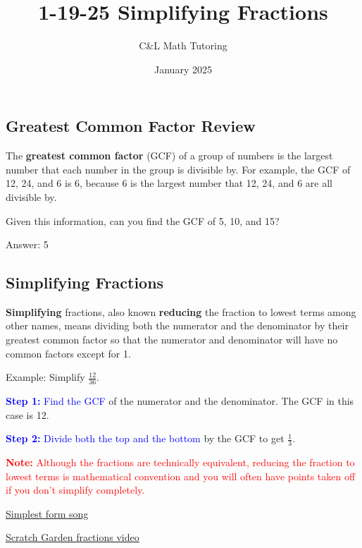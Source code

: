 \documentclass[a4paper, 12pt]{article}
\title{1-19-25 Simplifying Fractions}
\author{C\&L Math Tutoring}
\date{January 2025}
\begin{document}
\maketitle

\subsection*{Greatest Common Factor Review}
The \textbf{greatest common factor} (GCF) of a group of numbers is the largest number that each number in the group is divisible by. For example, the GCF of 12, 24, and 6 is 6, because 6 is the largest number that 12, 24, and 6 are all divisible by.

Given this information, can you find the GCF of 5, 10, and 15?

Answer: 5

\subsection*{Simplifying Fractions}
\textbf{Simplifying} fractions, also known \textbf{reducing} the fraction to lowest terms among other names, means dividing both the numerator and the denominator by their greatest common factor so that the numerator and denominator will have no common factors except for 1.

Example: Simplify $\frac{12}{36}$.

\textcolor{blue}{\textbf{Step 1:} Find the GCF} of the numerator and the denominator. The GCF in this case is 12.

\textcolor{blue}{\textbf{Step 2:} Divide both the top and the bottom} by the GCF to get $\boxed{\frac{1}{3}}$.

\textcolor{red}{\textbf{Note:} Although the fractions are technically equivalent, reducing the fraction to lowest terms is mathematical convention and you will often have points taken off if you don't simplify completely.}

\href{https://www.youtube.com/watch?v=U-1KjlJAA6M}{Simplest form song}

\href{https://www.youtube.com/watch?v=362JVVvgYPE}{Scratch Garden fractions video}
\end{document}
